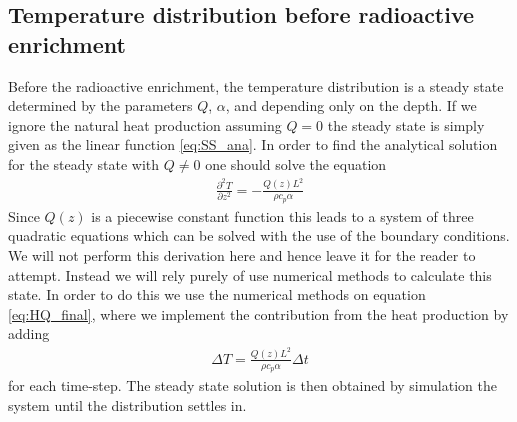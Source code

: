 \documentclass[%
 reprint,
nofootinbib,
aps,
]{revtex4-1}
\begin{document}
 \subsection{Temperature distribution before radioactive enrichment}
 Before the radioactive enrichment, the temperature distribution is a steady state determined by the parameters $Q$, $\alpha$, and depending only on the depth. If we ignore the natural heat production assuming $Q = 0$ the steady state is simply given as the linear function \ref{eq:SS_ana}. In order to find the analytical solution for the steady state with $Q \ne 0$ one should solve the equation
 \begin{align*}
     \frac{\partial^2 T}{\partial z^2} = - \frac{Q(z) L^2}{\rho c_p \alpha}
 \end{align*}
 Since $Q(z)$ is a piecewise constant function this leads to a system of three quadratic equations which can be solved with the use of the boundary conditions. We will not perform this derivation here and hence leave it for the reader to attempt. Instead we will rely purely of use numerical methods to calculate this state. In order to do this we use the numerical methods on equation \ref{eq:HQ_final}, where we implement the contribution from the heat production by adding
 \begin{align*}
     \Delta T = \frac{Q(z) L^2}{\rho c_p \alpha}\Delta t
 \end{align*}
 for each time-step. The steady state solution is then obtained by simulation the system until the distribution settles in.
\end{document}
